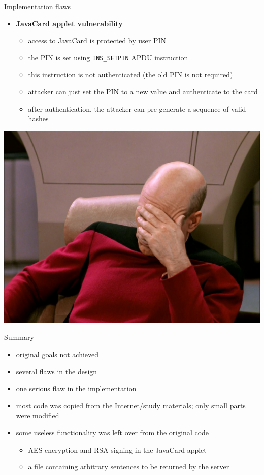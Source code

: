 \documentclass[12pt, t]{beamer}
\begin{document}
\begin{frame}[fragile]{Implementation flaws}
  \begin{itemize}
    \item \textbf{JavaCard applet vulnerability}
      \begin{itemize}
        \item access to JavaCard is protected by user PIN
        \item the PIN is set using \verb|INS_SETPIN| APDU instruction
        \item this instruction is not authenticated (the old PIN is not required)
        \item attacker can just set the PIN to a new value and authenticate to the card
        \item after authentication, the attacker can pre-generate a sequence of valid hashes
      \end{itemize}
  \end{itemize}
  \begin{center}
    \includegraphics[scale=0.07]{facepalm.jpg}
  \end{center}
\end{frame}

\begin{frame}{Summary}
  \begin{itemize}
    \item original goals not achieved
    \item several flaws in the design
    \item one serious flaw in the implementation
    \item most code was copied from the Internet/study materials; only small parts were modified
    \item some useless functionality was left over from the original code
     \begin{itemize}
       \item AES encryption and RSA signing in the JavaCard applet
       \item a file containing arbitrary sentences to be returned by the server
     \end{itemize}
  \end{itemize}
\end{frame}
\end{document}

